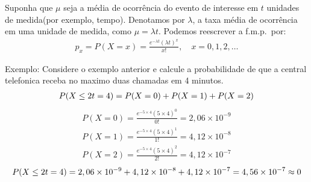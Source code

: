 \documentclass[11pt,a4paper]{book}
\begin{document}
     Suponha que $\mu$ seja a média de ocorrência do evento de interesse
     em $t$ unidades de medida(por exemplo, tempo). Denotamos por $\lambda$,
     a taxa média de ocorrência em uma unidade de medida, como $\mu= \lambda t$.
     Podemos reescrever a f.m.p.\ por:
     \begin{align*}
       p_{x} =P(X=x)= \frac{e^{-\lambda t} \left( \lambda t \right)^{x}}{x!}, \quad x=0,1,2,\ldots
     \end{align*}
     \begin{description} 
       \item{Exemplo}: Considere o exemplo anterior e calcule a probabilidade de que a central 
         telefonica receba no maximo duas chamadas em 4 minutos.
         \begin{align*}
           P(X \leq 2 \/ t=4) = P(X=0)+P(X=1)+P(X=2)
         \end{align*}
     \begin{align*}
       P(X=0) = \frac{e^{-5 \times 4}(5\times 4)^0}{0!}= 2,06 \times 10^{-9}\\
       P(X=1) = \frac{e^{-5 \times 4}(5\times 4)^1}{1!}= 4,12 \times 10^{-8}\\
       P(X=2) = \frac{e^{-5 \times 4}(5\times 4)^2}{2!}= 4,12 \times 10^{-7} 
     \end{align*}
    \begin{align*}
      P(X \leq 2 \/ t=4)= 2,06 \times 10^{-9}+4,12 \times 10^{-8}+4,12 \times 10^{-7} = 4,56 \times 10^{-7} \approx 0
    \end{align*} 

   \end{description}
 
\end{document}
